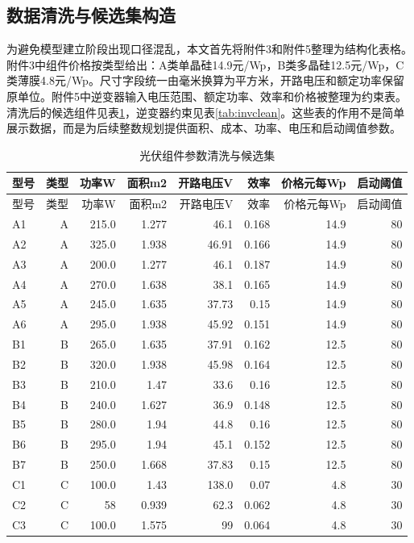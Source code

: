 \documentclass[UTF8,a4paper,12pt]{ctexart}
\begin{document}
\subsection{数据清洗与候选集构造}
为避免模型建立阶段出现口径混乱，本文首先将附件3和附件5整理为结构化表格。附件3中组件价格按类型给出：A类单晶硅14.9元/Wp，B类多晶硅12.5元/Wp，C类薄膜4.8元/Wp。尺寸字段统一由毫米换算为平方米，开路电压和额定功率保留原单位。附件5中逆变器输入电压范围、额定功率、效率和价格被整理为约束表。清洗后的候选组件见表\ref{tab:pvclean}，逆变器约束见表\ref{tab:invclean}。这些表的作用不是简单展示数据，而是为后续整数规划提供面积、成本、功率、电压和启动阈值参数。
\begin{center}\small
\begin{longtable}{lrrrrrrr}
\caption{光伏组件参数清洗与候选集}\label{tab:pvclean}\\
\toprule
型号 & 类型 & 功率W & 面积m2 & 开路电压V & 效率 & 价格元每Wp & 启动阈值\\\midrule
\endfirsthead
\toprule
型号 & 类型 & 功率W & 面积m2 & 开路电压V & 效率 & 价格元每Wp & 启动阈值\\\midrule
\endhead
A1 & A & 215.0 & 1.277 & 46.1 & 0.168 & 14.9 & 80\\
A2 & A & 325.0 & 1.938 & 46.91 & 0.166 & 14.9 & 80\\
A3 & A & 200.0 & 1.277 & 46.1 & 0.187 & 14.9 & 80\\
A4 & A & 270.0 & 1.638 & 38.1 & 0.165 & 14.9 & 80\\
A5 & A & 245.0 & 1.635 & 37.73 & 0.15 & 14.9 & 80\\
A6 & A & 295.0 & 1.938 & 45.92 & 0.151 & 14.9 & 80\\
B1 & B & 265.0 & 1.635 & 37.91 & 0.162 & 12.5 & 80\\
B2 & B & 320.0 & 1.938 & 45.98 & 0.164 & 12.5 & 80\\
B3 & B & 210.0 & 1.47 & 33.6 & 0.16 & 12.5 & 80\\
B4 & B & 240.0 & 1.627 & 36.9 & 0.148 & 12.5 & 80\\
B5 & B & 280.0 & 1.94 & 44.8 & 0.16 & 12.5 & 80\\
B6 & B & 295.0 & 1.94 & 45.1 & 0.152 & 12.5 & 80\\
B7 & B & 250.0 & 1.668 & 37.83 & 0.15 & 12.5 & 80\\
C1 & C & 100.0 & 1.43 & 138.0 & 0.07 & 4.8 & 30\\
C2 & C & 58 & 0.939 & 62.3 & 0.062 & 4.8 & 30\\
C3 & C & 100.0 & 1.575 & 99 & 0.064 & 4.8 & 30\\

\end{longtable}
\end{center}
\end{document}
